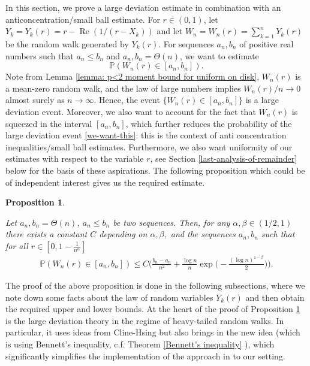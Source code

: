 \documentclass[9pt,a4paper,reqno]{amsart}
\renewcommand{\Re}{\operatorname{Re}}
\theoremstyle{mine}
\newtheorem{prop}[thm]{Proposition}
\theoremstyle{definition}
\theoremstyle{remark}
\newcommand{\mb}{\mathbb}
\begin{document}
In this section, we prove a large deviation estimate in combination with an anticoncentration/small ball estimate. For $r\in (0,1)$, let $Y_k = Y_k(r) = r - \Re(1/(r-X_k))$ and let $W_n = W_n(r) = \sum_{k=1}^n Y_k(r)$ be the random walk generated by $Y_k(r)$. For sequences $a_n,b_n$ of positive real numbers such that $a_n \leq b_n$ and $a_n, b_n = \Theta(n)$, we want to estimate 
\begin{equation}\label{we-want-this}
    \mb{P}\left(W_n(r) \in [a_n,b_n]\right).
\end{equation} 
Note from Lemma \ref{lemma: p<2 moment bound for uniform on disk}, $W_n(r)$ is a mean-zero random walk, and the law of large numbers implies $W_n(r)/n \to 0$ almost surely as $n\to \infty$. Hence, the event $\{W_n(r) \in [a_n, b_n]\}$ is a large deviation event. Moreover, we also want to account for the fact that $W_n(r)$ is squeezed in the interval $[a_n,b_n]$, which further reduces the probability of the large deviation event \eqref{we-want-this}: this is the context of anti concentration inequalities/small ball estimates. Furthermore, we also want uniformity of our estimates with respect to the variable $r$, see Section \ref{last-analysis-of-remainder} below for the basis of these aspirations. The following proposition which could be of independent interest gives us the required estimate. 


    \begin{prop}\label{dev-anti-conc}

Let $a_n,b_n = \Theta(n)$, $a_n \leq b_n$ be two sequences. Then, for any $\alpha, \beta \in (1/2,1)$ there exists a constant $C$ depending on $\alpha, \beta,$ and the sequences $a_n,b_n$ such that for all 
$r \in \left[0,  1-\frac{1}{n^{\alpha}}\right]$ 
\begin{align}\label{claim-anticoncentration}
     \mb{P}(W_n(r) \in [a_n,b_n]) \leq C \biggl( \frac{b_n-a_n}{n^2} + \frac{\log n}{n} \exp\bigl(-\frac{(\log n)^{1-\beta}}{2}\bigr)\biggr).
\end{align}
    \end{prop}
    
The proof of the above proposition is done in the following subsections, where we note down some facts about the law of random variables $Y_k(r)$ and then obtain the required upper and lower bounds. At the heart of the proof of Proposition \ref{dev-anti-conc} is the large deviation theory in the regime of heavy-tailed random walks. In particular, it uses ideas from Cline-Hsing \cite{cline-hsing} but also brings in the new idea (which is using  Bennett's inequality, c.f. Theorem    \ref{Bennett's inequality} ), which significantly simplifies the implementation of the approach in \cite{cline-hsing} to our setting.
\end{document}
